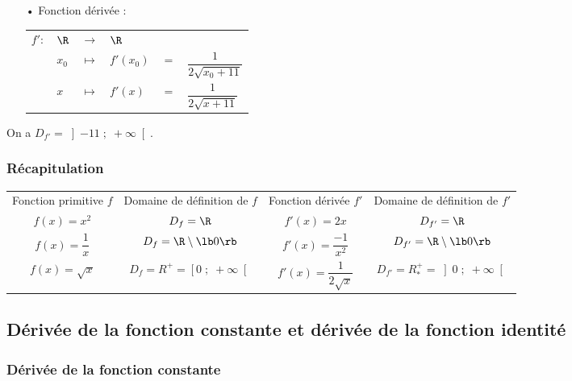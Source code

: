 \begin{itemize}
\item[•] Fonction dérivée : \\

\begin{tabular}{llllll}
$f' :$ & $\R$ & $\longrightarrow$ & $\R$ & & \\
& $x_0$ & $\longmapsto$ & $f'(x_0)$ & $ = $ & $\dfrac{1}{2\sqrt{x_0 + 11} }$ \vspace*{.3cm} \\
& $x$ & $\longmapsto$ & $f'(x)$ & $ = $ & $\dfrac{1}{2\sqrt{x + 11}}$ \\
\end{tabular}
\end{itemize}

\vspace*{.3cm}

On a $D_{f'} = \left]-11 \; ; \; +\infty\right[$.

\newpage

\subsubsection{Récapitulation}

\begin{tabular}{cccc}
Fonction primitive $f$ & Domaine de définition de $f$ & Fonction dérivée $f'$ & Domaine de définition de $f'$ \vspace*{.3cm }\\
$f(x) = x^2$ & $D_f = \R$ & $f'(x) = 2x$ & $D_{f'} = \R$ \vspace*{.3cm} \\
$f(x) = \dfrac{1}{x}$ & $D_f = \R \setminus \lb 0 \rb $ & $f'(x) = \dfrac{-1}{x^2}$ & $D_{f'} = \R \setminus \lb 0 \rb$ \vspace*{.3cm} \\
$f(x) = \sqrt{x}$ & $D_f = R^+ = \left[0 \; ; \; +\infty\right[$ & $f'(x) = \dfrac{1}{2\sqrt{x}}$ & $D_{f'} = R^+_* = \left]0 \; ; \; +\infty\right[$ \vspace*{.3cm} \\
\end{tabular}

\newpage

\subsection{Dérivée de la fonction constante et dérivée de la fonction identité}

\subsubsection{Dérivée de la fonction constante}


